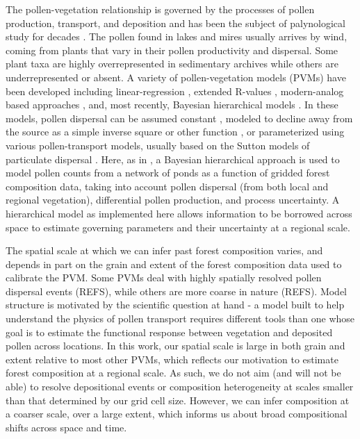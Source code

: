 \documentclass[12pt]{article}
\begin{document}
The pollen-vegetation relationship is governed by the processes of
pollen production, transport, and deposition and has been the subject
of palynological study for decades \citep{tauber1965,
  jacobson1981selection, jackson1994pollen, jackson1999pollen,
  sugita2007theory1, sugita2007theory2, prentice1988records}. The
pollen found in lakes and mires usually arrives by wind, coming from
plants that vary in their pollen productivity and dispersal. Some
plant taxa are highly overrepresented in sedimentary archives while
others are underrepresented or absent. A variety of pollen-vegetation
models (PVMs) have been developed including linear-regression
\citep{webb1981estimating, bradshaw1985relationships}, extended
R-values \citep{parsons1981statistical, sugita1994pollen,
  sugita2007theory1, sugita2007theory2}, modern-analog based
approaches \citep{williams2003variations}, and, most recently,
Bayesian hierarchical models \citep{paciorek2009mapping,
  garreta2010method}.  In these models, pollen dispersal can be
assumed constant \citep{davis1963theory, parsons1981statistical},
modeled to decline away from the source as a simple inverse square or
other function \citep{webb1981estimating, calcote1995pollen,
  jackson1998quantitative}, or parameterized using various
pollen-transport models, usually based on the Sutton models of
particulate dispersal \citep{prentice1988records, sugita2007theory1,
  sugita2007theory2, jackson1999pollen}. Here, as in
\citet{paciorek2009mapping}, a Bayesian hierarchical approach is used
to model pollen counts from a network of ponds as a function of
gridded forest composition data, taking into account pollen dispersal
(from both local and regional vegetation), differential pollen
production, and process uncertainty. A hierarchical model as
implemented here allows information to be borrowed across space to
estimate governing parameters and their uncertainty at a regional
scale.

The spatial scale at which we can infer past forest composition
varies, and depends in part on the grain and extent of the forest
composition data used to calibrate the PVM. Some PVMs deal with highly
spatially resolved pollen dispersal events (REFS), while others are
more coarse in nature (REFS). Model structure is motivated by the
scientific question at hand - a model built to help understand the
physics of pollen transport requires different tools than one whose
goal is to estimate the functional response between vegetation and
deposited pollen across locations. In this work, our spatial scale is
large in both grain and extent relative to most other PVMs, which
reflects our motivation to estimate forest composition at a regional
scale. As such, we do not aim (and will not be able) to resolve
depositional events or composition heterogeneity at scales smaller
than that determined by our grid cell size. However, we can infer
composition at a coarser scale, over a large extent, which informs us
about broad compositional shifts across space and time.
\end{document}
